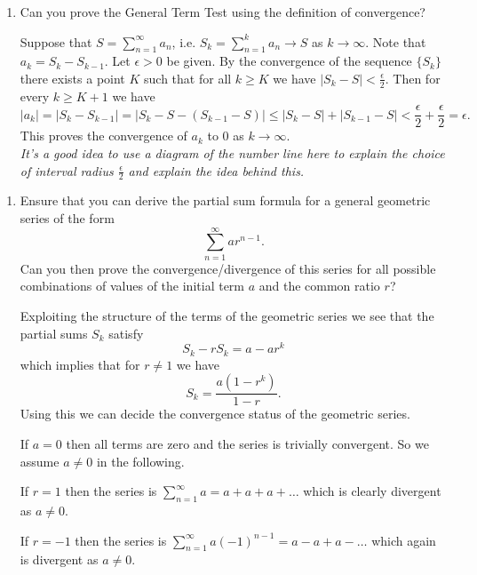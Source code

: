 \documentclass[oneside,10pt]{memoir}
\newcounter{pass}
\begin{document}
{\begin{enumerate}
\item
Can you prove the General Term Test using the definition of convergence?
\begin{solution}{Suppose that $S = \sum_{n=1}^\infty a_n$, i.e. $S_k = \sum_{n=1}^k a_n \to S$ as $k \to \infty$. Note that $a_k = S_k - S_{k-1}$. Let $\epsilon > 0$ be given. By the convergence of the sequence $\{ S_k \}$ there exists a point $K$ such that for all $k \geq K$ we have $|S_k - S| < \frac{\epsilon}{2}$. Then for every $k \geq K+1$ we have
$$|a_k| = |S_k - S_{k-1}| = |S_k - S - (S_{k-1} - S)| \leq |S_k - S| + |S_{k-1} - S| < \frac{\epsilon}{2} + \frac{\epsilon}{2} = \epsilon.$$ This proves the convergence of $a_k$ to 0 as $k \to \infty$.\\
\textit{It's a good idea to use a diagram of the number line here to explain the choice of interval radius $\frac{\epsilon}{2}$ and explain the idea behind this.}}\end{solution}
\setcounter{pass}{\value{enumi}}
\end{enumerate}
\vskip 2pt

\begin{enumerate}
\setcounter{enumi}{\value{pass}}
\item
Ensure that you can derive the partial sum formula for a general geometric series of the form
$$\sum_{n=1}^\infty a r^{n-1}.$$
Can you then prove the convergence/divergence of this series for all possible combinations of values of the initial term $a$ and the common ratio $r$?
\begin{solution}Exploiting the structure of the terms of the geometric series we see that the partial sums $S_k$ satisfy
$$S_k - rS_{k} = a - ar^k$$
which implies that for $r \neq 1$ we have
$$S_k = \frac{a(1-r^k)}{1-r} .$$
Using this we can decide the convergence status of the geometric series.

If $a=0$ then all terms are zero and the series is trivially convergent. So we assume $a \neq 0$ in the following.

If $r=1$ then the series is $\sum_{n=1}^\infty a = a + a + a + \dots $ which is clearly divergent as $a \neq 0$.

If $r=-1$ then the series is $\sum_{n=1}^\infty a(-1)^{n-1} = a - a + a - \dots $ which again is divergent as $a \neq 0$.


\end{solution}
\end{enumerate}}
\end{document}
